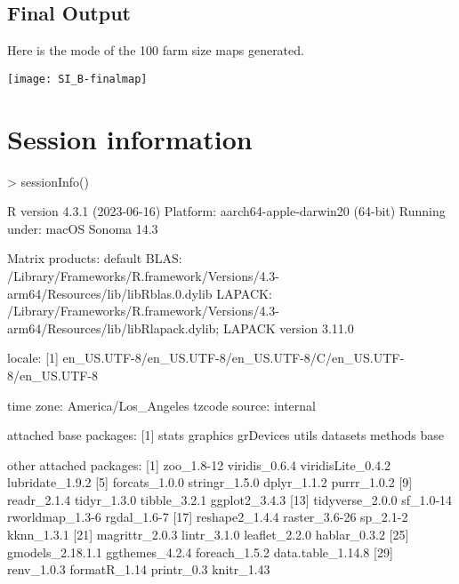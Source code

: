 \documentclass{article}
\begin{document}
\subsection{Final Output}

Here is the mode of the 100 farm size maps generated.

\texttt{[image: SI\_B-finalmap]}

\newpage
\section*{Session information}

\begin{Schunk}
\begin{Sinput}
> sessionInfo()
\end{Sinput}
\begin{Soutput}
R version 4.3.1 (2023-06-16)
Platform: aarch64-apple-darwin20 (64-bit)
Running under: macOS Sonoma 14.3

Matrix products: default
BLAS:   /Library/Frameworks/R.framework/Versions/4.3-arm64/Resources/lib/libRblas.0.dylib 
LAPACK: /Library/Frameworks/R.framework/Versions/4.3-arm64/Resources/lib/libRlapack.dylib;  LAPACK version 3.11.0

locale:
[1] en_US.UTF-8/en_US.UTF-8/en_US.UTF-8/C/en_US.UTF-8/en_US.UTF-8

time zone: America/Los_Angeles
tzcode source: internal

attached base packages:
[1] stats     graphics  grDevices utils     datasets  methods   base     

other attached packages:
 [1] zoo_1.8-12        viridis_0.6.4     viridisLite_0.4.2 lubridate_1.9.2  
 [5] forcats_1.0.0     stringr_1.5.0     dplyr_1.1.2       purrr_1.0.2      
 [9] readr_2.1.4       tidyr_1.3.0       tibble_3.2.1      ggplot2_3.4.3    
[13] tidyverse_2.0.0   sf_1.0-14         rworldmap_1.3-6   rgdal_1.6-7      
[17] reshape2_1.4.4    raster_3.6-26     sp_2.1-2          kknn_1.3.1       
[21] magrittr_2.0.3    lintr_3.1.0       leaflet_2.2.0     hablar_0.3.2     
[25] gmodels_2.18.1.1  ggthemes_4.2.4    foreach_1.5.2     data.table_1.14.8
[29] renv_1.0.3        formatR_1.14      printr_0.3        knitr_1.43       


\end{Soutput}
\end{Schunk}
\end{document}
